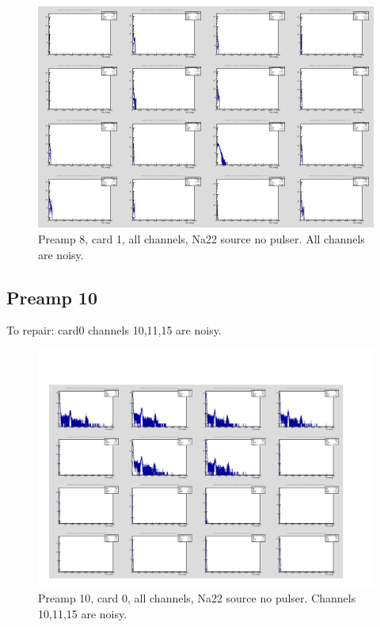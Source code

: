 \documentclass{report}
\begin{document}
\begin{figure}[!htb]
  \includegraphics[width=\linewidth]{dr_latest_test/preamp8_lim_energy_card1_all_no_pulser.png}
  \caption{Preamp 8, card 1, all channels, Na22 source  no pulser. All channels are noisy.}
\end{figure}
\newpage
\clearpage


\subsection{Preamp 10}
To repair: card0 channels 10,11,15 are noisy.
\begin{figure}[!htb]
  \includegraphics[width=\linewidth]{small_box_card0_all_nopulser.png}
  \caption{Preamp 10, card 0, all channels, Na22 source  no pulser. Channels 10,11,15 are noisy.}
\end{figure}
\end{document}
